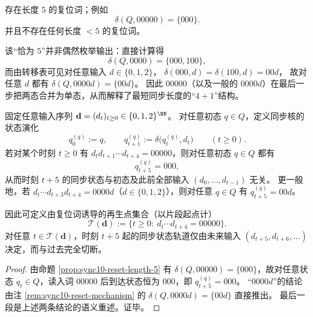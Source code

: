 \begin{proposition}[10 态同步核的最短同步长度恰为 $5$]\label{prop:sync10-reset-length-5}
存在长度 $5$ 的复位词；例如
\[
\delta(Q,00000)=\{000\}.
\]
并且不存在任何长度 $<5$ 的复位词。
\end{proposition}

\begin{remark}\label{rem:sync10-reset-mechanism}
该“恰为 $5$”并非偶然枚举输出：直接计算得
\[
\delta(Q,0000)=\{000,100\},
\]
而由转移表可见对任意输入 $d\in\{0,1,2\}$，
\(
\delta(000,d)=\delta(100,d)=00d
\)，
故对任意 $d$ 都有
\(
\delta(Q,0000d)=\{00d\}
\)。
因此 $00000$（以及一般的 $0000d$）在最后一步把两态合并为单态，从而解释了最短同步长度的“$4+1$”结构。
\end{remark}

\begin{proposition}\label{prop:sync10-regeneration}
固定任意输入序列 \(\mathbf d=(d_t)_{t\ge 0}\in\{0,1,2\}^{\NN}\)。
对任意初态 \(q\in Q\)，定义同步核的状态演化
\[
q^{(q)}_0:=q,\qquad q^{(q)}_{t+1}:=\delta\!\bigl(q^{(q)}_t,d_t\bigr)\qquad(t\ge 0).
\]
若对某个时刻 \(t\ge 0\) 有 \(d_t d_{t+1}\cdots d_{t+4}=00000\)，则对任意初态 \(q\in Q\) 都有
\[
q^{(q)}_{t+5}=000,
\]
从而时刻 \(t+5\) 的同步状态与初态及此前全部输入 \((d_0,\dots,d_{t-1})\) 无关。
更一般地，若 \(d_t\cdots d_{t+3}d_{t+4}=0000d\)（\(d\in\{0,1,2\}\)），则对任意 \(q\in Q\) 有 \(q^{(q)}_{t+5}=00d\)。
\par
因此可定义由复位词诱导的再生点集合（以片段起点计）
\[
\mathcal T(\mathbf d):=\{t\ge 0:\ d_t\cdots d_{t+4}=00000\}.
\]
对任意 \(t\in\mathcal T(\mathbf d)\)，时刻 \(t+5\) 起的同步状态轨道仅由未来输入 \((d_{t+5},d_{t+6},\dots)\) 决定，而与过去完全切断。
\end{proposition}
\begin{proof}
由命题 \ref{prop:sync10-reset-length-5} 有 \(\delta(Q,00000)=\{000\}\)，故对任意状态 \(q_t\in Q\)，读入词 \(00000\) 后到达状态恒为 \(000\)，即 \(q^{(q)}_{t+5}=000\)。
“\(0000d\)”的结论由注 \ref{rem:sync10-reset-mechanism} 的 \(\delta(Q,0000d)=\{00d\}\) 直接推出。
最后一段是上述两条结论的语义重述。证毕。
\end{proof}

